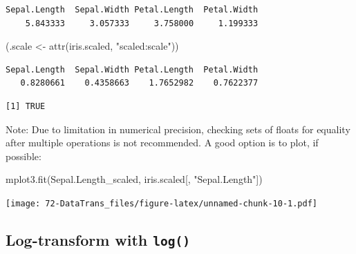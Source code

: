 \documentclass[
]{book}
\newenvironment{Shaded}{\begin{snugshade}}{\end{snugshade}}
\newcommand{\DecValTok}[1]{\textcolor[rgb]{0.00,0.00,0.81}{#1}}
\newcommand{\FunctionTok}[1]{\textcolor[rgb]{0.00,0.00,0.00}{#1}}
\newcommand{\NormalTok}[1]{#1}
\newcommand{\OtherTok}[1]{\textcolor[rgb]{0.56,0.35,0.01}{#1}}
\newcommand{\SpecialCharTok}[1]{\textcolor[rgb]{0.00,0.00,0.00}{#1}}
\newcommand{\StringTok}[1]{\textcolor[rgb]{0.31,0.60,0.02}{#1}}
\begin{document}
\begin{verbatim}
Sepal.Length  Sepal.Width Petal.Length  Petal.Width 
    5.843333     3.057333     3.758000     1.199333 
\end{verbatim}

\begin{Shaded}
\begin{Highlighting}[]
\NormalTok{(.scale }\OtherTok{\textless{}{-}} \FunctionTok{attr}\NormalTok{(iris.scaled, }\StringTok{"scaled:scale"}\NormalTok{))}
\end{Highlighting}
\end{Shaded}

\begin{verbatim}
Sepal.Length  Sepal.Width Petal.Length  Petal.Width 
   0.8280661    0.4358663    1.7652982    0.7622377 
\end{verbatim}

\begin{Shaded}
\end{Shaded}

\begin{verbatim}
[1] TRUE
\end{verbatim}

Note: Due to limitation in numerical precision, checking sets of floats for equality after multiple operations is not recommended. A good option is to plot, if possible:

\begin{Shaded}
\begin{Highlighting}[]
\FunctionTok{mplot3.fit}\NormalTok{(Sepal.Length\_scaled, iris.scaled[, }\StringTok{"Sepal.Length"}\NormalTok{])}
\end{Highlighting}
\end{Shaded}

\texttt{[image: 72-DataTrans\_files/figure-latex/unnamed-chunk-10-1.pdf]}

\hypertarget{log-transform-with-log}{%
\subsection{\texorpdfstring{Log-transform with \texttt{log()}}{Log-transform with log()}}\label{log-transform-with-log}}
\end{document}
